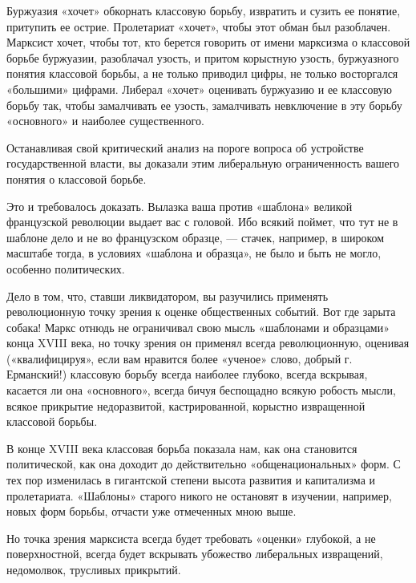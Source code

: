 \documentclass[12pt]{article}
\newcommand{\parnum}{(\arabic{parcount})}
\newcounter{parcount}
\newenvironment{parnumbers}{%
  \par%
  \everypar{\noindent \stepcounter{parcount}\marginpar[]{\parnum}}%
}{}
\begin{document}
\begin{parnumbers}
    Буржуазия «хочет» обкорнать классовую борьбу, извратить и сузить ее понятие, притупить ее острие. Пролетариат «хочет», чтобы этот обман был разоблачен. Марксист хочет, чтобы тот, кто берется говорить от имени марксизма о классовой борьбе буржуазии, разоблачал узость, и притом корыстную узость, буржуазного понятия классовой борьбы, а не только приводил цифры, не только восторгался «большими» цифрами. Либерал «хочет» оценивать буржуазию и ее классовую борьбу так, чтобы замалчивать ее узость, замалчивать невключение в эту борьбу «основного» и наиболее существенного.

    Останавливая свой критический анализ на пороге вопроса об устройстве государственной власти, вы доказали этим либеральную ограниченность вашего понятия о классовой борьбе.

    Это и требовалось доказать. Вылазка ваша против «шаблона» великой французской революции выдает вас с головой. Ибо всякий поймет, что тут не в шаблоне дело и не во французском образце, — стачек, например, в широком масштабе тогда, в условиях «шаблона и образца», не было и быть не могло, особенно политических.

    Дело в том, что, ставши ликвидатором, вы разучились применять революционную точку зрения к оценке общественных событий. Вот где зарыта собака! Маркс отнюдь не ограничивал свою мысль «шаблонами и образцами» конца XVIII века, но точку зрения он применял всегда революционную, оценивая («квалифицируя», если вам нравится более «ученое» слово, добрый г. Ерманский!) классовую борьбу всегда наиболее глубоко, всегда вскрывая, касается ли она «основного», всегда бичуя беспощадно всякую робость мысли, всякое прикрытие недоразвитой, кастрированной, корыстно извращенной классовой борьбы.

    В конце XVIII века классовая борьба показала нам, как она становится политической, как она доходит до действительно «общенациональных» форм. С тех пор изменилась в гигантской степени высота развития и капитализма и пролетариата. «Шаблоны» старого никого не остановят в изучении, например, новых форм борьбы, отчасти уже отмеченных мною выше.

    Но точка зрения марксиста всегда будет требовать «оценки» глубокой, а не поверхностной, всегда будет вскрывать убожество либеральных извращений, недомолвок, трусливых прикрытий.
  \end{parnumbers}
\end{document}
